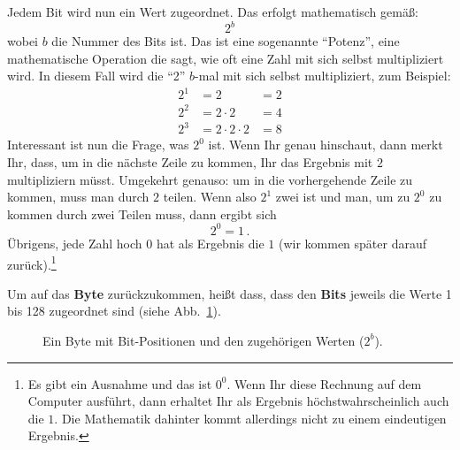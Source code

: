 \noindent
Jedem Bit wird nun ein Wert zugeordnet. Das erfolgt mathematisch gemäß:
\begin{equation*}
  2^b
\end{equation*}
wobei $b$ die Nummer des Bits ist. Das ist eine sogenannte ``Potenz'', eine mathematische Operation die sagt, wie oft eine Zahl mit sich selbst multipliziert wird. In diesem Fall wird die ``2'' $b$-mal mit sich selbst multipliziert, zum Beispiel:
\begin{align*}
  2^1 &= 2              &= 2\\
  2^2 &= 2\cdot2        &= 4\\
  2^3 &= 2\cdot2\cdot2  &= 8
\end{align*}
Interessant ist nun die Frage, was $2^0$ ist. Wenn Ihr genau hinschaut, dann merkt Ihr, dass, um in die nächste Zeile zu kommen, Ihr das Ergebnis mit $2$ multipliziern müsst. Umgekehrt genauso: um in die vorhergehende Zeile zu kommen, muss man durch $2$ teilen. Wenn also $2^1$ zwei ist und man, um zu $2^0$ zu kommen durch zwei Teilen muss, dann ergibt sich
\begin{equation*}
  2^0 = 1\,.
\end{equation*}
Übrigens, jede Zahl hoch $0$ hat als Ergebnis die $1$ (wir kommen später darauf zurück).\footnote{%
  Es gibt ein Ausnahme und das ist $0^0$. Wenn Ihr diese Rechnung auf dem Computer ausführt, dann erhaltet Ihr als Ergebnis höchstwahrscheinlich auch die $1$. Die Mathematik dahinter kommt allerdings nicht zu einem eindeutigen Ergebnis.}

Um auf das \textbf{Byte} zurückzukommen, heißt dass, dass den \textbf{Bits} jeweils die Werte 1 bis 128 zugeordnet sind (siehe Abb.~\ref{fig:byte_values}).

\begin{figure}[h]
  \centering
  \caption{Ein Byte mit Bit-Positionen und den zugehörigen Werten ($2^b$).}
  \label{fig:byte_values}
\end{figure}

